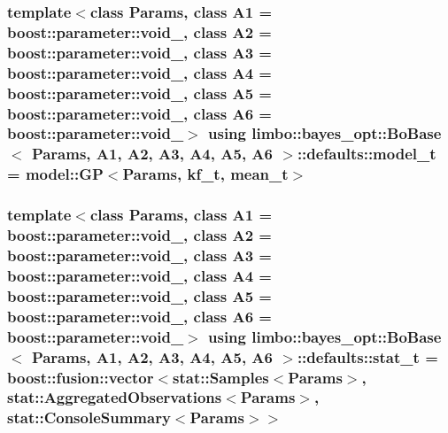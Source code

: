 \subsubsection[{\texorpdfstring{model\+\_\+t}{model_t}}]{\setlength{\rightskip}{0pt plus 5cm}template$<$class Params, class A1 = boost\+::parameter\+::void\+\_\+, class A2 = boost\+::parameter\+::void\+\_\+, class A3 = boost\+::parameter\+::void\+\_\+, class A4 = boost\+::parameter\+::void\+\_\+, class A5 = boost\+::parameter\+::void\+\_\+, class A6 = boost\+::parameter\+::void\+\_\+$>$ using {\bf limbo\+::bayes\+\_\+opt\+::\+Bo\+Base}$<$ Params, A1, A2, A3, A4, A5, A6 $>$\+::{\bf defaults\+::model\+\_\+t} =  {\bf model\+::\+GP}$<$Params, {\bf kf\+\_\+t}, {\bf mean\+\_\+t}$>$}\hypertarget{structlimbo_1_1bayes__opt_1_1_bo_base_1_1defaults_aa9a30c408b869fd46861b028b6325b4a}{}\label{structlimbo_1_1bayes__opt_1_1_bo_base_1_1defaults_aa9a30c408b869fd46861b028b6325b4a}
\subsubsection[{\texorpdfstring{stat\+\_\+t}{stat_t}}]{\setlength{\rightskip}{0pt plus 5cm}template$<$class Params, class A1 = boost\+::parameter\+::void\+\_\+, class A2 = boost\+::parameter\+::void\+\_\+, class A3 = boost\+::parameter\+::void\+\_\+, class A4 = boost\+::parameter\+::void\+\_\+, class A5 = boost\+::parameter\+::void\+\_\+, class A6 = boost\+::parameter\+::void\+\_\+$>$ using {\bf limbo\+::bayes\+\_\+opt\+::\+Bo\+Base}$<$ Params, A1, A2, A3, A4, A5, A6 $>$\+::{\bf defaults\+::stat\+\_\+t} =  boost\+::fusion\+::vector$<${\bf stat\+::\+Samples}$<$Params$>$, {\bf stat\+::\+Aggregated\+Observations}$<$Params$>$, {\bf stat\+::\+Console\+Summary}$<$Params$>$$>$}\hypertarget{structlimbo_1_1bayes__opt_1_1_bo_base_1_1defaults_a3c475362a937e011e02c715e8edbf2d1}{}\label{structlimbo_1_1bayes__opt_1_1_bo_base_1_1defaults_a3c475362a937e011e02c715e8edbf2d1}
